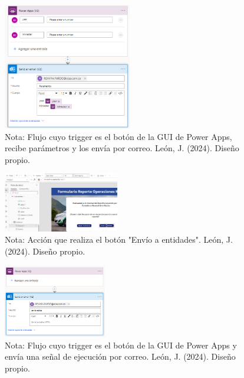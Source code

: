 \documentclass[letter,oneside,12pt,spanish]{report}
\begin{document}
\begin{figure}[ht]
    \centering
    \includegraphics[width=0.5\textwidth]{Figs/Formulario CGN Flow - APP.png}
    \label{fig:FlowParams}
    \\Nota: Flujo cuyo trigger es el botón de la GUI de Power Apps, recibe parámetros y los envía por correo. León, J. (2024). Diseño propio.
\end{figure}


\begin{figure}[ht]
    \centering
    \includegraphics[width=0.45\textwidth]{Figs/Action Enviar a entidades - APP.png}
    \label{fig:ActionSendButton}
    \\Nota: Acción que realiza el botón "Envío a entidades". León, J. (2024). Diseño propio.
\end{figure}


\begin{figure}[ht]
    \centering
    \includegraphics[width=0.4\textwidth]{Figs/Envio Entidades Flow - APP.png}
    \label{fig:FlowSend}
    \\Nota: Flujo cuyo trigger es el botón de la GUI de Power Apps y envía una señal de ejecución por correo. León, J. (2024). Diseño propio.
\end{figure}
\end{document}

